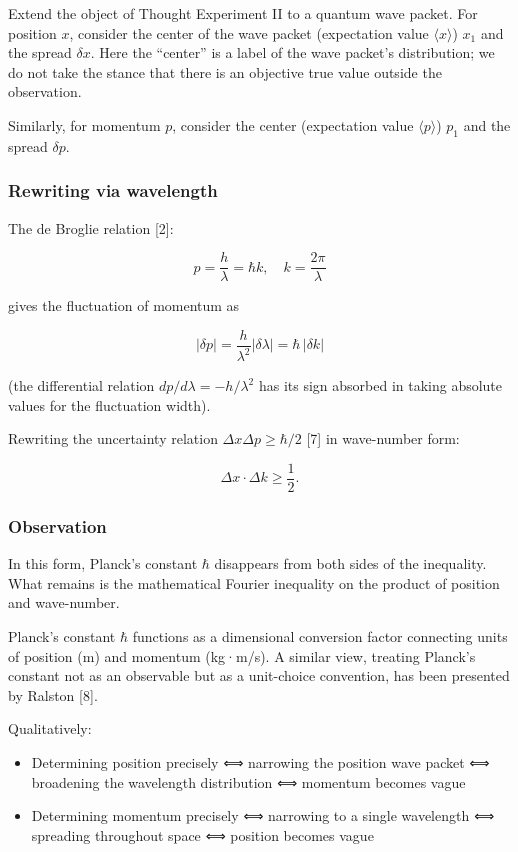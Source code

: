 \documentclass[
]{article}
\providecommand{\tightlist}{%
  \setlength{\itemsep}{0pt}\setlength{\parskip}{0pt}}
\begin{document}
Extend the object of Thought Experiment II to a quantum wave packet. For
position \(x\), consider the center of the wave packet (expectation
value \(\langle x \rangle\)) \(x_1\) and the spread \(\delta x\). Here
the ``center'' is a label of the wave packet's distribution; we do not
take the stance that there is an objective true value outside the
observation.

Similarly, for momentum \(p\), consider the center (expectation value
\(\langle p \rangle\)) \(p_1\) and the spread \(\delta p\).

\subsubsection{Rewriting via wavelength}\label{rewriting-via-wavelength}

The de Broglie relation {[}2{]}:

\[p = \frac{h}{\lambda} = \hbar k, \quad k = \frac{2\pi}{\lambda}\]

gives the fluctuation of momentum as

\[|\delta p| = \frac{h}{\lambda^2}|\delta\lambda| = \hbar \, |\delta k|\]

(the differential relation \(dp/d\lambda = -h/\lambda^2\) has its sign
absorbed in taking absolute values for the fluctuation width).

Rewriting the uncertainty relation \(\Delta x \Delta p \geq \hbar/2\)
{[}7{]} in wave-number form:

\[\Delta x \cdot \Delta k \geq \frac{1}{2}.\]

\subsubsection{Observation}\label{observation}

In this form, Planck's constant \(\hbar\) disappears from both sides of
the inequality. What remains is the mathematical Fourier inequality on
the product of position and wave-number.

Planck's constant \(\hbar\) functions as a dimensional conversion factor
connecting units of position (m) and momentum (kg·m/s). A similar view,
treating Planck's constant not as an observable but as a unit-choice
convention, has been presented by Ralston {[}8{]}.

Qualitatively:

\begin{itemize}
\tightlist
\item
  Determining position precisely ⟺ narrowing the position wave packet ⟺
  broadening the wavelength distribution ⟺ momentum becomes vague
\item
  Determining momentum precisely ⟺ narrowing to a single wavelength ⟺
  spreading throughout space ⟺ position becomes vague
\end{itemize}
\end{document}
